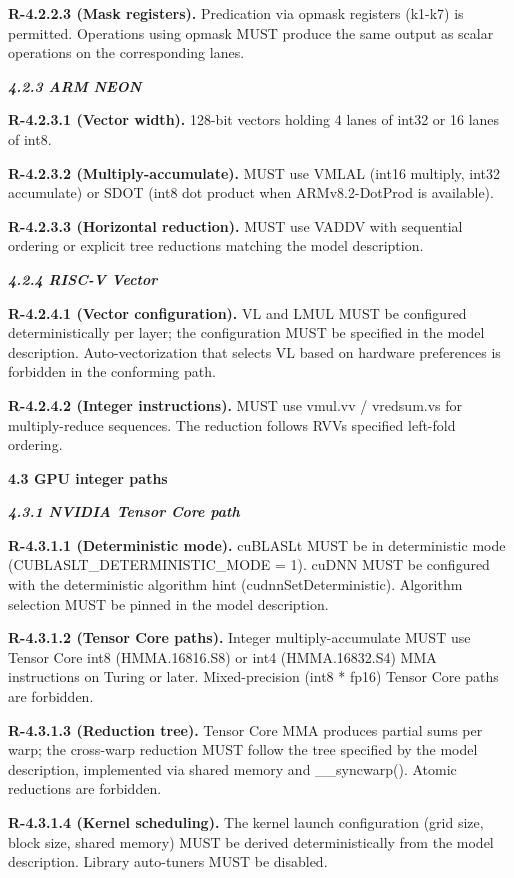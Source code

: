 \documentclass[
]{article}
\begin{document}
\textbf{R-4.2.2.3 (Mask registers).} Predication via opmask registers
(k1-k7) is permitted. Operations using opmask MUST produce the same
output as scalar operations on the corresponding lanes.

\emph{\textbf{4.2.3 ARM NEON}}

\textbf{R-4.2.3.1 (Vector width).} 128-bit vectors holding 4 lanes of
int32 or 16 lanes of int8.

\textbf{R-4.2.3.2 (Multiply-accumulate).} MUST use VMLAL (int16
multiply, int32 accumulate) or SDOT (int8 dot product when
ARMv8.2-DotProd is available).

\textbf{R-4.2.3.3 (Horizontal reduction).} MUST use VADDV with
sequential ordering or explicit tree reductions matching the model
description.

\emph{\textbf{4.2.4 RISC-V Vector}}

\textbf{R-4.2.4.1 (Vector configuration).} VL and LMUL MUST be
configured deterministically per layer; the configuration MUST be
specified in the model description. Auto-vectorization that selects VL
based on hardware preferences is forbidden in the conforming path.

\textbf{R-4.2.4.2 (Integer instructions).} MUST use vmul.vv / vredsum.vs
for multiply-reduce sequences. The reduction follows
RVV\textquotesingle s specified left-fold ordering.

\textbf{4.3 GPU integer paths}

\emph{\textbf{4.3.1 NVIDIA Tensor Core path}}

\textbf{R-4.3.1.1 (Deterministic mode).} cuBLASLt MUST be in
deterministic mode (CUBLASLT\_DETERMINISTIC\_MODE = 1). cuDNN MUST be
configured with the deterministic algorithm hint
(cudnnSetDeterministic). Algorithm selection MUST be pinned in the model
description.

\textbf{R-4.3.1.2 (Tensor Core paths).} Integer multiply-accumulate MUST
use Tensor Core int8 (HMMA.16816.S8) or int4 (HMMA.16832.S4) MMA
instructions on Turing or later. Mixed-precision (int8 * fp16) Tensor
Core paths are forbidden.

\textbf{R-4.3.1.3 (Reduction tree).} Tensor Core MMA produces partial
sums per warp; the cross-warp reduction MUST follow the tree specified
by the model description, implemented via shared memory and
\_\_syncwarp(). Atomic reductions are forbidden.

\textbf{R-4.3.1.4 (Kernel scheduling).} The kernel launch configuration
(grid size, block size, shared memory) MUST be derived deterministically
from the model description. Library auto-tuners MUST be disabled.
\end{document}
